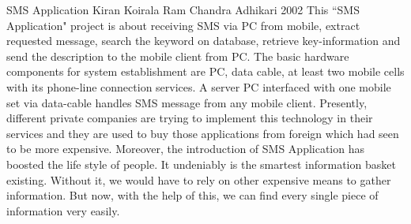 \begin{conf-abstract}[]
{SMS Application}
{ 
Kiran Koirala
Ram Chandra Adhikari
}
{2002}
This ``SMS Application" project is about receiving SMS via PC from mobile, extract requested message, search the keyword on database, retrieve key-information and send the description to the mobile client from PC. The basic hardware components for system establishment are PC, data cable, at least two mobile cells with its phone-line connection services. A server PC interfaced with one mobile set via data-cable handles SMS message from any mobile client. Presently, different private companies are trying to implement this technology in their services and they are used to buy those applications from foreign which had seen to be more expensive. Moreover, the introduction of SMS Application has boosted the life style of people. It undeniably is the smartest information basket existing. Without it, we would have to rely on other expensive means to gather information. But now, with the help of this, we can find every single piece of information very easily.
\end{conf-abstract}	